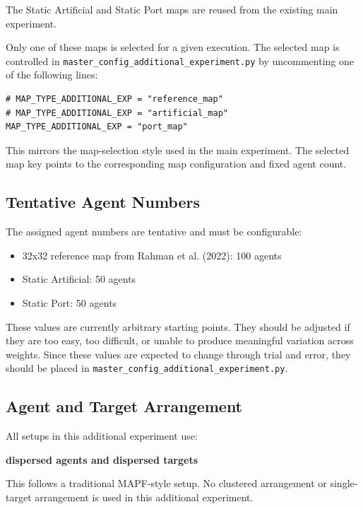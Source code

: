 \documentclass[11pt,a4paper]{article}
\begin{document}
The Static Artificial and Static Port maps are reused from the existing main experiment.

Only one of these maps is selected for a given execution. The selected map is controlled in \texttt{master\_config\_additional\_experiment.py} by uncommenting one of the following lines:

\begin{verbatim}
# MAP_TYPE_ADDITIONAL_EXP = "reference_map"
# MAP_TYPE_ADDITIONAL_EXP = "artificial_map"
MAP_TYPE_ADDITIONAL_EXP = "port_map"
\end{verbatim}

This mirrors the map-selection style used in the main experiment. The selected map key points to the corresponding map configuration and fixed agent count.

\subsection*{Tentative Agent Numbers}

The assigned agent numbers are tentative and must be configurable:

\begin{itemize}[leftmargin=2em]
    \item 32x32 reference map from Rahman et al. (2022): 100 agents
    \item Static Artificial: 50 agents
    \item Static Port: 50 agents
\end{itemize}

These values are currently arbitrary starting points. They should be adjusted if they are too easy, too difficult, or unable to produce meaningful variation across weights. Since these values are expected to change through trial and error, they should be placed in \texttt{master\_config\_additional\_experiment.py}.

\subsection*{Agent and Target Arrangement}

All setups in this additional experiment use:

\begin{center}
\textbf{dispersed agents and dispersed targets}
\end{center}

This follows a traditional MAPF-style setup. No clustered arrangement or single-target arrangement is used in this additional experiment.
\end{document}

